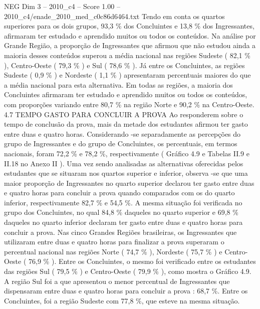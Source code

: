 \begin{textsample}{NEG Dim 3 – 2010\_c4 – Score 1.00 – 2010\_c4/enade\_2010\_med\_c0c86d6464.txt}
Tendo em conta os quartos superiores para os dois grupos, 93,3 \% dos Concluintes e 13,8 \% dos Ingressantes, afirmaram ter estudado e aprendido muitos ou todos os conteúdos.
Na análise por Grande Região, a proporção de Ingressantes que afirmou que não estudou ainda a maioria desses conteúdos superou a média nacional nas regiões Sudeste ( 82,1 \% ), Centro-Oeste ( 79,3 \% ) e Sul ( 78,6 \% ).
Já entre os Concluintes, as regiões Sudeste ( 0,9 \% ) e Nordeste ( 1,1 \% ) apresentaram percentuais maiores do que a média nacional para esta alternativa.
Em todas as regiões, a maioria dos Concluintes afirmaram ter estudado e aprendido muitos ou todos os conteúdos, com proporções variando entre 80,7 \% na região Norte e 90,2 \% na Centro-Oeste. 4.7 TEMPO GASTO PARA CONCLUIR A PROVA Ao responderem sobre o tempo de conclusão da prova, mais da metade dos estudantes afirmou ter gasto entre duas e quatro horas.
Considerando -se separadamente as percepções do grupo de Ingressantes e do grupo de Concluintes, os percentuais, em termos nacionais, foram 72,2 \% e 78,2 \%, respectivamente ( Gráfico 4.9 e Tabelas II.9 e II.18 no Anexo II ).
Uma vez sendo analisadas as alternativas oferecidas pelos estudantes que se situaram nos quartos superior e inferior, observa -se que uma maior proporção de Ingressantes no quarto superior declarou ter gasto entre duas e quatro horas para concluir a prova quando comparados com os do quarto inferior, respectivamente 82,7 \% e 54,5 \%.
A mesma situação foi verificada no grupo dos Concluintes, no qual 84,8 \% daqueles no quarto superior e 69,8 \% daqueles no quarto inferior declaram ter gasto entre duas e quatro horas para concluir a prova.
Nas cinco Grandes Regiões brasileiras, os Ingressantes que utilizaram entre duas e quatro horas para finalizar a prova superaram o percentual nacional nas regiões Norte ( 74,7 \% ), Nordeste ( 75,7 \% ) e Centro-Oeste ( 76,9 \% ).
Entre os Concluintes, o mesmo foi verificado entre os estudantes das regiões Sul ( 79,5 \% ) e Centro-Oeste ( 79,9 \% ), como mostra o Gráfico 4.9.
A região Sul foi a que apresentou o menor percentual de Ingressantes que dispensaram entre duas e quatro horas para concluir a prova : 68,7 \%.
Entre os Concluintes, foi a região Sudeste com 77,8 \%, que esteve na mesma situação.

\end{textsample}
